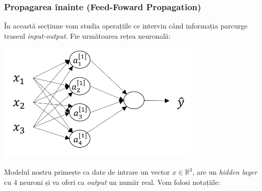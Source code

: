 \subsubsection{Propagarea înainte (Feed-Foward Propagation)}
În această secțiune vom studia operațiile ce intervin când informația parcurge traseul \textit{input-output}. Fie următoarea rețea neuronală:

\begin{center}
\includegraphics[scale=1]{feedFoward}
\end{center}

Modelul nostru primește ca date de intrare un vector $x \in \mathbb{R}^3$, are un \textit{hidden layer} cu 4 neuroni și va oferi ca \textit{output} un număr real. Vom folosi notațiile:

